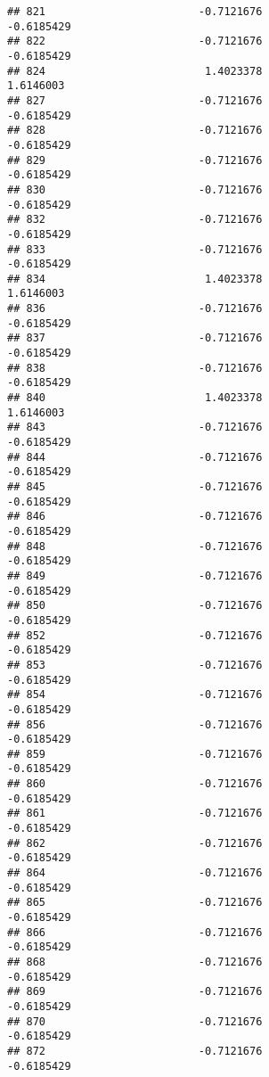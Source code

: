 \documentclass[
]{article}
\begin{document}
\begin{verbatim}
## 821                        -0.7121676                       -0.6185429
## 822                        -0.7121676                       -0.6185429
## 824                         1.4023378                        1.6146003
## 827                        -0.7121676                       -0.6185429
## 828                        -0.7121676                       -0.6185429
## 829                        -0.7121676                       -0.6185429
## 830                        -0.7121676                       -0.6185429
## 832                        -0.7121676                       -0.6185429
## 833                        -0.7121676                       -0.6185429
## 834                         1.4023378                        1.6146003
## 836                        -0.7121676                       -0.6185429
## 837                        -0.7121676                       -0.6185429
## 838                        -0.7121676                       -0.6185429
## 840                         1.4023378                        1.6146003
## 843                        -0.7121676                       -0.6185429
## 844                        -0.7121676                       -0.6185429
## 845                        -0.7121676                       -0.6185429
## 846                        -0.7121676                       -0.6185429
## 848                        -0.7121676                       -0.6185429
## 849                        -0.7121676                       -0.6185429
## 850                        -0.7121676                       -0.6185429
## 852                        -0.7121676                       -0.6185429
## 853                        -0.7121676                       -0.6185429
## 854                        -0.7121676                       -0.6185429
## 856                        -0.7121676                       -0.6185429
## 859                        -0.7121676                       -0.6185429
## 860                        -0.7121676                       -0.6185429
## 861                        -0.7121676                       -0.6185429
## 862                        -0.7121676                       -0.6185429
## 864                        -0.7121676                       -0.6185429
## 865                        -0.7121676                       -0.6185429
## 866                        -0.7121676                       -0.6185429
## 868                        -0.7121676                       -0.6185429
## 869                        -0.7121676                       -0.6185429
## 870                        -0.7121676                       -0.6185429
## 872                        -0.7121676                       -0.6185429

\end{verbatim}
\end{document}
